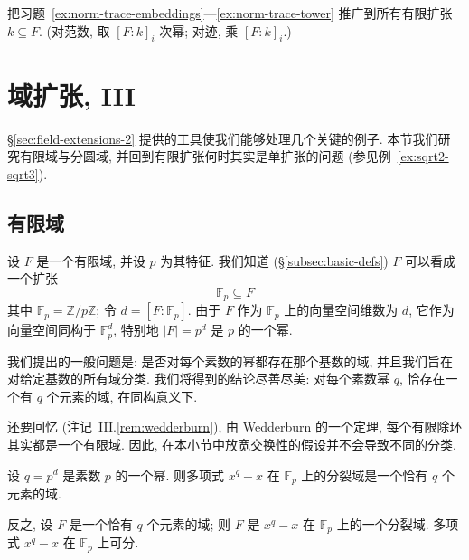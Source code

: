 \begin{prob}\label{ex:norm-trace-gen}
把习题~\ref{ex:norm-trace-embeddings}—\ref{ex:norm-trace-tower} 推广到所有有限扩张 $k\subseteq F$. (对范数, 取 $[F:k]_i$ 次幂; 对迹, 乘 $[F:k]_i$.)
\end{prob}

\section{域扩张, III}\label{sec:field-extensions-3}

§\ref{sec:field-extensions-2} 提供的工具使我们能够处理几个关键的例子. 本节我们研究有限域与分圆域, 并回到有限扩张何时其实是单扩张的问题 (参见例~\ref{ex:sqrt2-sqrt3}).

\subsection{有限域}\label{subsec:finite-fields}

设 $F$ 是一个有限域, 并设 $p$ 为其特征. 我们知道 (§\ref{subsec:basic-defs}) $F$ 可以看成一个扩张
\[
\mathbb{F}_p\subseteq F
\]
其中 $\mathbb{F}_p=\mathbb{Z}/p\mathbb{Z}$; 令 $d=[F:\mathbb{F}_p]$. 由于 $F$ 作为 $\mathbb{F}_p$ 上的向量空间维数为 $d$, 它作为向量空间同构于 $\mathbb{F}_p^d$, 特别地 $|F|=p^d$ 是 $p$ 的一个幂.

我们提出的一般问题是: 是否对每个素数的幂都存在那个基数的域, 并且我们旨在对给定基数的所有域分类. 我们将得到的结论尽善尽美: 对每个素数幂 $q$, 恰存在一个有 $q$ 个元素的域, 在同构意义下.

还要回忆 (注记~III.\ref{rem:wedderburn}), 由 Wedderburn 的一个定理, 每个有限除环其实都是一个有限域. 因此, 在本小节中放宽交换性的假设并不会导致不同的分类.

\begin{theorem}\label{thm:finite-field-classification}
设 $q=p^d$ 是素数 $p$ 的一个幂. 则多项式 $x^q-x$ 在 $\mathbb{F}_p$ 上的分裂域是一个恰有 $q$ 个元素的域.

反之, 设 $F$ 是一个恰有 $q$ 个元素的域; 则 $F$ 是 $x^q-x$ 在 $\mathbb{F}_p$ 上的一个分裂域. 多项式 $x^q-x$ 在 $\mathbb{F}_p$ 上可分.
\end{theorem}

